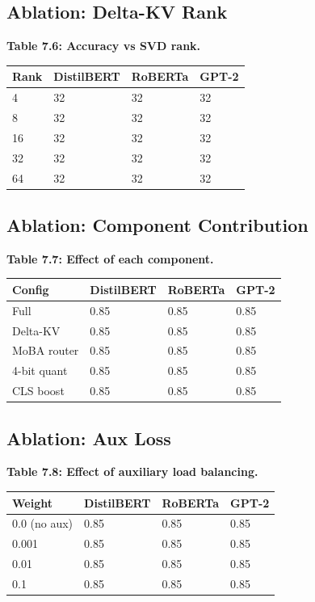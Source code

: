 \subsection{Ablation: Delta-KV Rank}

\textbf{Table 7.6: Accuracy vs SVD rank.}

\begin{table}[H]
\centering
\small
\begin{tabular}{llll}
\toprule
\textbf{Rank} & \textbf{DistilBERT} & \textbf{RoBERTa} & \textbf{GPT-2} \\
\midrule
4 & 32 & 32 & 32 \\
8 & 32 & 32 & 32 \\
16 & 32 & 32 & 32 \\
32 & 32 & 32 & 32 \\
64 & 32 & 32 & 32 \\
\bottomrule
\end{tabular}
\end{table}

\subsection{Ablation: Component Contribution}

\textbf{Table 7.7: Effect of each component.}

\begin{table}[H]
\centering
\small
\begin{tabular}{llll}
\toprule
\textbf{Config} & \textbf{DistilBERT} & \textbf{RoBERTa} & \textbf{GPT-2} \\
\midrule
Full & 0.85 & 0.85 & 0.85 \\
Delta-KV & 0.85 & 0.85 & 0.85 \\
MoBA router & 0.85 & 0.85 & 0.85 \\
4-bit quant & 0.85 & 0.85 & 0.85 \\
CLS boost & 0.85 & 0.85 & 0.85 \\
\bottomrule
\end{tabular}
\end{table}

\subsection{Ablation: Aux Loss}

\textbf{Table 7.8: Effect of auxiliary load balancing.}

\begin{table}[H]
\centering
\small
\begin{tabular}{llll}
\toprule
\textbf{Weight} & \textbf{DistilBERT} & \textbf{RoBERTa} & \textbf{GPT-2} \\
\midrule
0.0 (no aux) & 0.85 & 0.85 & 0.85 \\
0.001 & 0.85 & 0.85 & 0.85 \\
0.01 & 0.85 & 0.85 & 0.85 \\
0.1 & 0.85 & 0.85 & 0.85 \\
\bottomrule
\end{tabular}
\end{table}

